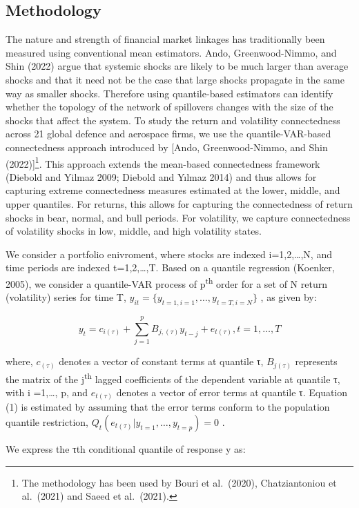 \documentclass[
  letterpaper,
  DIV=11,
  numbers=noendperiod]{scrartcl}
\begin{document}
\hypertarget{methodology}{%
\subsection{Methodology}\label{methodology}}

The nature and strength of financial market linkages has traditionally
been measured using conventional mean estimators. Ando, Greenwood-Nimmo,
and Shin (2022) argue that systemic shocks are likely to be much larger
than average shocks and that it need not be the case that large shocks
propagate in the same way as smaller shocks. Therefore using
quantile-based estimators can identify whether the topology of the
network of spillovers changes with the size of the shocks that affect
the system. To study the return and volatility connectedness across 21
global defence and aerospace firms, we use the quantile-VAR-based
connectedness approach introduced by {[}Ando, Greenwood-Nimmo, and Shin
(2022){]}\footnote{The methodology has been used by Bouri et al.~(2020),
  Chatziantoniou et al.~(2021) and Saeed et al.~(2021).}. This approach
extends the mean-based connectedness framework (Diebold and Yilmaz 2009;
Diebold and Yılmaz 2014) and thus allows for capturing extreme
connectedness measures estimated at the lower, middle, and upper
quantiles. For returns, this allows for capturing the connectedness of
return shocks in bear, normal, and bull periods. For volatility, we
capture connectedness of volatility shocks in low, middle, and high
volatility states.

We consider a portfolio enivroment, where stocks are indexed
i=1,2,\ldots,N, and time periods are indexed t=1,2,\ldots,T. Based on a
quantile regression (Koenker, 2005), we consider a quantile-VAR process
of p\textsuperscript{th} order for a set of N return (volatility) series
for time T, \(y_{it}=\{y_{t=1,i=1},\dots,y_{t=T,i=N}\}\) , as given by:

\[
y_{t}=c_{i(\tau)}+\sum_{j=1}^{p} B_{j,(\tau)} y_{t-j}+e_{t(\tau)}, t=1,\dots,T
\]

where, \(c_{(\tau)}\) denotes a vector of constant terms at quantile τ,
\(B_{j(\tau)}\) represents the matrix of the j\textsuperscript{th}
lagged coefficients of the dependent variable at quantile τ, with i
=1,\ldots, p, and \(e_{t(\tau)}\) denotes a vector of error terms at
quantile τ. Equation (1) is estimated by assuming that the error terms
conform to the population quantile restriction,
\(Q_t(e_{t(\tau)} |y_{t=1},\dots,y_{t=p})=0\) .

We express the τth conditional quantile of response y as:
\end{document}

